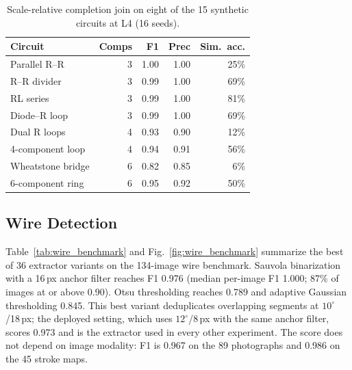 \documentclass[journal]{IEEEtran}
\begin{document}
\begin{table}[!t]
\caption{Scale-relative completion join on eight of the 15 synthetic circuits at L4 (16 seeds).}
\label{tab:per_circuit}
\centering
\footnotesize
\begin{tabular}{lrrrr}
\toprule
\textbf{Circuit} & \textbf{Comps} & \textbf{F1} & \textbf{Prec} & \textbf{Sim.\ acc.} \\
\midrule
Parallel R--R & 3 & 1.00 & 1.00 & 25\% \\
R--R divider & 3 & 0.99 & 1.00 & 69\% \\
RL series & 3 & 0.99 & 1.00 & 81\% \\
Diode--R loop & 3 & 0.99 & 1.00 & 69\% \\
Dual R loops & 4 & 0.93 & 0.90 & 12\% \\
4-component loop & 4 & 0.94 & 0.91 & 56\% \\
Wheatstone bridge & 6 & 0.82 & 0.85 & 6\% \\
6-component ring & 6 & 0.95 & 0.92 & 50\% \\
\bottomrule
\end{tabular}
\end{table}

\subsection{Wire Detection}

Table~\ref{tab:wire_benchmark} and Fig.~\ref{fig:wire_benchmark} summarize the best of 36 extractor variants on the 134-image wire benchmark. Sauvola binarization with a 16\,px anchor filter reaches F1 0.976 (median per-image F1 1.000; 87\% of images at or above 0.90). Otsu thresholding reaches 0.789 and adaptive Gaussian thresholding 0.845. This best variant deduplicates overlapping segments at $10^{\circ}$/18\,px; the deployed setting, which uses $12^{\circ}$/8\,px with the same anchor filter, scores 0.973 and is the extractor used in every other experiment. The score does not depend on image modality: F1 is 0.967 on the 89 photographs and 0.986 on the 45 stroke maps.
\end{document}
